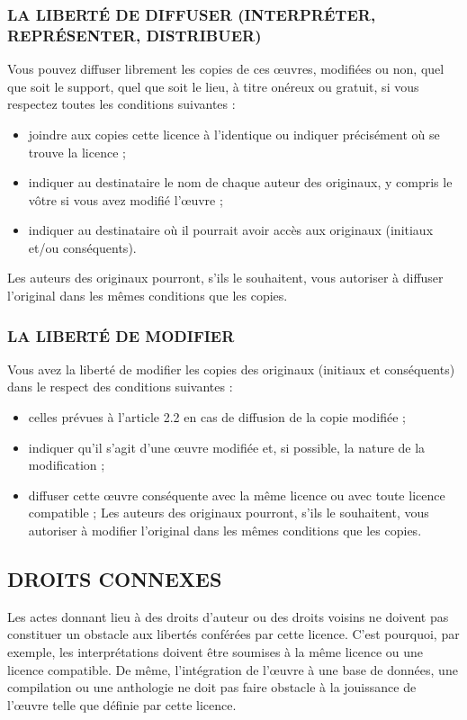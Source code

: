 \subsubsection{LA LIBERT\'E DE DIFFUSER (INTERPR\'ETER, REPR\'ESENTER, DISTRIBUER)}
Vous pouvez diffuser librement les copies de ces \oe uvres, modifi\'ees ou non, quel que soit le support, quel que soit le lieu, \`a titre on\'ereux ou gratuit, si vous respectez toutes les conditions suivantes :
\begin{itemize}
\item joindre aux copies cette licence \`a l'identique ou indiquer pr\'ecis\'ement o\`u se trouve la licence ;
\item indiquer au destinataire le nom de chaque auteur des originaux, y compris le v\^otre si vous avez modifi\'e l'\oe uvre ;
\item indiquer au destinataire o\`u il pourrait avoir acc\`es aux originaux (initiaux et/ou cons\'equents).
\end{itemize}

Les auteurs des originaux pourront, s'ils le souhaitent, vous autoriser \`a diffuser l'original dans les m\^emes conditions que les copies.

\subsubsection{LA LIBERT\'E DE MODIFIER}
Vous avez la libert\'e de modifier les copies des originaux (initiaux et cons\'equents) dans le respect des conditions suivantes :
\begin{itemize}
\item celles pr\'evues \`a l'article 2.2 en cas de diffusion de la copie modifi\'ee ;
\item indiquer qu'il s'agit d'une \oe uvre modifi\'ee et, si possible, la nature de la modification ;
\item diffuser cette \oe uvre cons\'equente avec la m\^eme licence ou avec toute licence compatible ;
Les auteurs des originaux pourront, s'ils le souhaitent, vous autoriser \`a modifier l'original dans les m\^emes conditions que les copies.
\end{itemize}

\subsection{DROITS CONNEXES}
Les actes donnant lieu \`a des droits d'auteur ou des droits voisins ne doivent pas constituer un obstacle aux libert\'es conf\'er\'ees par cette licence.
C'est pourquoi, par exemple, les interpr\'etations doivent \^etre soumises \`a la m\^eme licence ou une licence compatible. De m\^eme, l'int\'egration de l'\oe uvre \`a une base de donn\'ees, une compilation ou une anthologie ne doit pas faire obstacle \`a la jouissance de l'\oe uvre telle que d\'efinie par cette licence.

